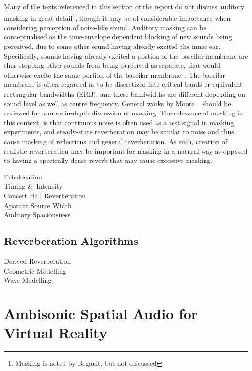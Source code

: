 \documentclass[paper=a4, fontsize=10pt, font=arial]{scrartcl} %
\numberwithin{equation}{section} %
\numberwithin{figure}{section} %
\numberwithin{table}{section} %
\begin{document}
Many of the texts referenced in this section of the report do not discuss auditory masking in great detail\footnote{Masking is noted by Begault, but not discussed}, though it may be of considerable importance when considering perception of noise-like sound. Auditory masking can be conceptualised as the time-envelope dependent blocking of new sounds being perceived, due to some other sound having already excited the inner ear. Specifically, sounds having already excited a portion of the bascilar membrane are thus stopping other sounds from being perceived as separate, that would otherwise excite the same portion of the bascilar membrane~\cite{Everest2009}. The bascilar membrane is often regarded as to be discretized into critical bands or equivalent rectangular bandwidths (ERB), and these bandwidths are different depending on sound level as well as centre frequency. General works by Moore ~\cite{Moore1996} should be reviewed for a more in-depth discussion of masking. The relevance of masking in this context, is that continuous noise is often used as a test signal in masking experiments, and steady-state reverberation may be similar to noise and thus cause masking of reflections and general reverberation. As such, creation of realistic reverberation may be important for masking in a natural way as opposed to having a spectrally dense reverb that may cause excessive masking.

Echolocation\\

Timing \&\ Intensity\\

Concert Hall Reverberation\\

Aparant Source Width\\

Auditory Spaciousness\\

\subsection{Reverberation Algorithms}

Derived Reverberation\\

Geometric Modelling\\

Wave Modelling\\

\section{Ambisonic Spatial Audio for Virtual Reality}
\end{document}

